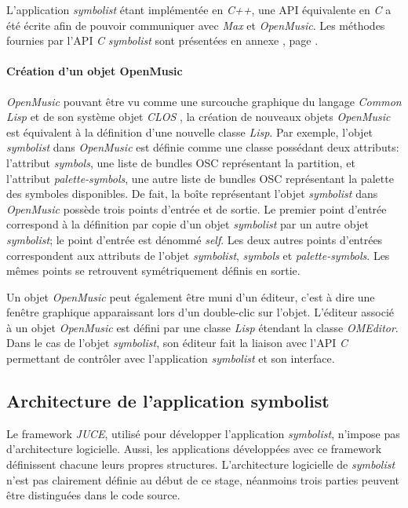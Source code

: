 L'application \textit{symbolist} étant implémentée en \textit{C++}, une API équivalente en \textit{C} a été écrite afin de pouvoir communiquer avec \textit{Max} et \textit{OpenMusic}.
Les méthodes fournies par l'API \textit{C} \textit{symbolist} sont présentées en annexe , page .

\paragraph{Création d'un objet OpenMusic} \textit{OpenMusic} pouvant être vu comme une surcouche graphique du langage \textit{Common Lisp} et de son système objet \textit{CLOS} \cite{bresson2009}, la création de nouveaux objets \textit{OpenMusic} est équivalent à la définition d'une nouvelle classe \textit{Lisp}.
Par exemple, l'objet \textit{symbolist} dans \textit{OpenMusic} est définie comme une classe possédant deux attributs: l'attribut \textit{symbols}, une liste de bundles OSC représentant la partition, et l'attribut \textit{palette-symbols}, une autre liste de bundles OSC représentant la palette des symboles disponibles.  
De fait, la boîte représentant l'objet \textit{symbolist} dans \textit{OpenMusic} possède trois points d'entrée et de sortie. Le premier point d'entrée correspond à la définition par copie d'un objet \textit{symbolist} par un autre objet \textit{symbolist}; le point d'entrée est dénommé \textit{self}. Les deux autres points d'entrées correspondent aux attributs de l'objet \textit{symbolist}, \textit{symbols} et \textit{palette-symbols}.
Les mêmes points se retrouvent symétriquement définis en sortie.

Un objet \textit{OpenMusic} peut également être muni d'un éditeur, c'est à dire une fenêtre graphique apparaissant lors d'un double-clic sur l'objet. L'éditeur associé à un objet \textit{OpenMusic} est défini par une classe \textit{Lisp} étendant la classe \textit{OMEditor}. 
Dans le cas de l'objet \textit{symbolist}, son éditeur fait la liaison avec l'API \textit{C} permettant de contrôler avec l'application \textit{symbolist} et son interface.
 
\subsection{Architecture de l'application symbolist}
\label{subsec:architectureBefore}
Le framework \textit{JUCE}, utilisé pour développer l'application \textit{symbolist}, n'impose pas d'architecture logicielle. Aussi, les applications développées avec ce framework définissent chacune leurs propres structures.
L'architecture logicielle de \textit{symbolist} n'est pas clairement définie au début de ce stage, néanmoins trois parties peuvent être distinguées dans le code source. 

